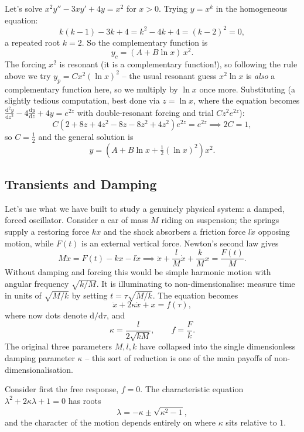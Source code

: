 \begin{example}
	Let's solve $x^2 y'' - 3xy' + 4y = x^2$ for $x > 0$. Trying $y = x^k$ in the homogeneous equation:
	$$
	k(k - 1) - 3k + 4 = k^2 - 4k + 4 = (k - 2)^2 = 0,
	$$
	a repeated root $k = 2$. So the complementary function is
	$$
	y_c = (A + B \ln x)\, x^2.
	$$
	The forcing $x^2$ is resonant (it is a complementary function!), so following the rule above we try $y_p = C x^2 (\ln x)^2$ -- the usual resonant guess $x^2 \ln x$ is \emph{also} a complementary function here, so we multiply by $\ln x$ once more. Substituting (a slightly tedious computation, best done via $z = \ln x$, where the equation becomes $\frac{\mathrm{d}^2y}{\mathrm{d}z^2} - 4\frac{\mathrm{d}y}{\mathrm{d}z} + 4y = e^{2z}$ with double-resonant forcing and trial $Cz^2 e^{2z}$):
	$$
	C\left(2 + 8z + 4z^2 - 8z - 8z^2 + 4z^2\right)e^{2z} = e^{2z} \implies 2C = 1,
	$$
	so $C = \frac12$ and the general solution is
	$$
	y = \left(A + B \ln x + \tfrac{1}{2}(\ln x)^2\right) x^2.
	$$
\end{example}

\subsection{Transients and Damping}

Let's use what we have built to study a genuinely physical system: a damped, forced oscillator. Consider a car of mass $M$ riding on suspension; the springs supply a restoring force $kx$ and the shock absorbers a friction force $l \dot x$ opposing motion, while $F(t)$ is an external vertical force. Newton's second law gives
$$
M \ddot x = F(t) - kx - l \dot x \implies \ddot x + \frac{l}{M} \dot x + \frac{k}{M} x = \frac{F(t)}{M}.
$$
Without damping and forcing this would be simple harmonic motion with angular frequency $\sqrt{k/M}$. It is illuminating to non-dimensionalise: measure time in units of $\sqrt{M/k}$ by setting $t = \tau \sqrt{M/k}$. The equation becomes
$$
\ddot x + 2\kappa \dot x + x = f(\tau),
$$
where now dots denote $\mathrm{d}/\mathrm{d}\tau$, and
$$
\kappa = \frac{l}{2\sqrt{kM}}, \qquad f = \frac{F}{k}.
$$
The original three parameters $M, l, k$ have collapsed into the single dimensionless damping parameter $\kappa$ -- this sort of reduction is one of the main payoffs of non-dimensionalisation.

Consider first the free response, $f = 0$. The characteristic equation $\lambda^2 + 2\kappa \lambda + 1 = 0$ has roots
$$
\lambda = -\kappa \pm \sqrt{\kappa^2 - 1},
$$
and the character of the motion depends entirely on where $\kappa$ sits relative to $1$.

